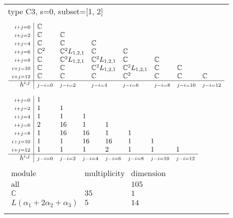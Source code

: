 \documentclass[crop,border=2mm]{standalone}
\begin{document}
\begin{tabular}{l}
{\huge type C3, s=0, subset=[1, 2]}\\ \\


$\displaystyle
\begin{array}{r|l l l l l l l}
	{\scriptstyle i+j=0}&\mathbb{C}&&&&&&\\
	{\scriptstyle i+j=2}&\mathbb{C}&\mathbb{C}&&&&&\\
	{\scriptstyle i+j=4}&\mathbb{C}&\mathbb{C}&\mathbb{C}&&&&\\
	{\scriptstyle i+j=6}&\mathbb{C}^{2}&\mathbb{C}^{2}L_{1,2,1}&\mathbb{C}&\mathbb{C}&&&\\
	{\scriptstyle i+j=8}&\mathbb{C}&\mathbb{C}^{2}L_{1,2,1}&\mathbb{C}^{2}L_{1,2,1}&\mathbb{C}&\mathbb{C}&&\\
	{\scriptstyle i+j=10}&\mathbb{C}&\mathbb{C}&\mathbb{C}^{2}L_{1,2,1}&\mathbb{C}^{2}L_{1,2,1}&\mathbb{C}&\mathbb{C}&\\
	{\scriptstyle i+j=12}&\mathbb{C}&\mathbb{C}&\mathbb{C}&\mathbb{C}^{2}&\mathbb{C}&\mathbb{C}&\mathbb{C}\\
	\hline h^{i,j}&{\scriptstyle j-i=0}&{\scriptstyle j-i=2}&{\scriptstyle j-i=4}&{\scriptstyle j-i=6}&{\scriptstyle j-i=8}&{\scriptstyle j-i=10}&{\scriptstyle j-i=12}
\end{array}
$ \\ \\


$\displaystyle
\begin{array}{r|l l l l l l l}
	{\scriptstyle i+j=0}&1&&&&&&\\
	{\scriptstyle i+j=2}&1&1&&&&&\\
	{\scriptstyle i+j=4}&1&1&1&&&&\\
	{\scriptstyle i+j=6}&2&16&1&1&&&\\
	{\scriptstyle i+j=8}&1&16&16&1&1&&\\
	{\scriptstyle i+j=10}&1&1&16&16&1&1&\\
	{\scriptstyle i+j=12}&1&1&1&2&1&1&1\\
	\hline h^{i,j}&{\scriptstyle j-i=0}&{\scriptstyle j-i=2}&{\scriptstyle j-i=4}&{\scriptstyle j-i=6}&{\scriptstyle j-i=8}&{\scriptstyle j-i=10}&{\scriptstyle j-i=12}
\end{array}
$ \\ \\


$\displaystyle
\begin{array}{rll}
	\text{module}&\text{multiplicity}&\text{dimension} \\ \hline \text{all}&&105 \\
	\mathbb{C}&35&1\\
	L\left(\alpha_{1}+ 2\alpha_{2}+\alpha_{3}\right)&5&14
\end{array}
$ \\ \\

\end{tabular}
\end{document}
